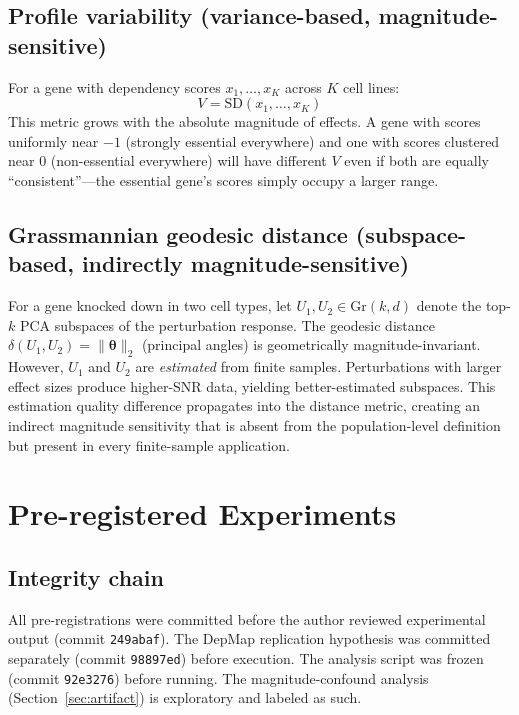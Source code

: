 \documentclass[11pt]{article}
\begin{document}
\subsection{Profile variability (variance-based, magnitude-sensitive)}

For a gene with dependency scores $x_1, \ldots, x_K$ across $K$ cell
lines:
\begin{equation}
  V = \text{SD}(x_1, \ldots, x_K)
\end{equation}
This metric grows with the absolute magnitude of effects. A gene with
scores uniformly near $-1$ (strongly essential everywhere) and one with
scores clustered near $0$ (non-essential everywhere) will have different
$V$ even if both are equally ``consistent''---the essential gene's
scores simply occupy a larger range.

\subsection{Grassmannian geodesic distance (subspace-based, indirectly magnitude-sensitive)}

For a gene knocked down in two cell types, let $U_1, U_2 \in
\text{Gr}(k, d)$ denote the top-$k$ PCA subspaces of the perturbation
response. The geodesic distance $\delta(U_1, U_2) =
\|\boldsymbol{\theta}\|_2$ (principal angles) is geometrically
magnitude-invariant. However, $U_1$ and $U_2$ are \emph{estimated} from
finite samples. Perturbations with larger effect sizes produce
higher-SNR data, yielding better-estimated subspaces. This estimation
quality difference propagates into the distance metric, creating an
indirect magnitude sensitivity that is absent from the population-level
definition but present in every finite-sample application.

\section{Pre-registered Experiments}

\subsection{Integrity chain}

All pre-registrations were committed before the author reviewed
experimental output (commit \texttt{249abaf}). The DepMap replication
hypothesis was committed separately (commit \texttt{98897ed}) before
execution. The analysis script was frozen (commit \texttt{92e3276})
before running. The magnitude-confound analysis (Section~\ref{sec:artifact})
is exploratory and labeled as such.
\end{document}

